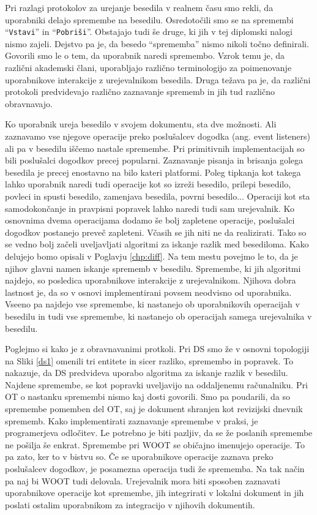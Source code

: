 \documentclass[a4paper, 12pt, twoside]{book}
\begin{document}
Pri razlagi protokolov za urejanje besedila v realnem času smo rekli, da uporabniki delajo spremembe na besedilu. Osredotočili smo se na spremembi “{\tt Vstavi}” in “{\tt Pobriši}”. Obstajajo tudi še druge, ki jih v tej diplomski nalogi nismo zajeli. Dejstvo pa je, da besedo “sprememba” nismo nikoli točno definirali. Govorili smo le o tem, da uporabnik naredi spremembo. Vzrok temu je, da različni akademski člani, uporabljajo različno terminologijo za poimenovanje uporabnikove interakcije z urejevalnikom besedila. Druga težava pa je, da različni protokoli predvidevajo različno zaznavanje sprememb in jih tud različno obravnavajo.

Ko uporabnik ureja besedilo v svojem dokumentu, sta dve možnosti. Ali zaznavamo vse njegove operacije preko poslušalcev dogodka (ang. event listeners) ali pa v besedilu iščemo nastale spremembe. Pri primitivnih implementacijah so bili poslušalci dogodkov precej popularni. Zaznavanje pisanja in brisanja golega besedila je precej enostavno na bilo kateri platformi. Poleg tipkanja kot takega lahko uporabnik naredi tudi operacije kot so izreži besedilo, prilepi besedilo, povleci in spusti besedilo, zamenjava besedila, povrni besedilo... Operaciji kot sta samodokončanje in pravpisni popravek lahko naredi tudi sam urejevalnik. Ko osnovnima dvema operacijama dodamo še bolj zapletene operacije, poslušalci dogodkov postanejo preveč zapleteni. Včasih se jih niti ne da realizirati. Tako so se vedno bolj začeli uveljavljati algoritmi za iskanje razlik med besediloma. Kako delujejo bomo opisali v Poglavju \ref{chp:diff}. Na tem mestu povejmo le to, da je njihov glavni namen iskanje sprememb v besedilu. Spremembe, ki jih algoritmi najdejo, so posledica uporabnikove interakcije z urejevalnikom. Njihova dobra lastnost je, da so v osnovi implementirani povsem neodvisno od uporabnika. Vseeno pa najdejo vse spremembe, ki nastanejo ob uporabnikovih operacijah v besedilu in tudi vse spremembe, ki nastanejo ob operacijah samega urejevalnika v besedilu.

Poglejmo si kako je z obravnavanimi protkoli. Pri DS smo že v osnovni topologiji na Sliki \ref{ds1} omenili tri entitete in sicer razliko, spremembo in popravek. To nakazuje, da DS predvideva uporabo algoritma za iskanje razlik v besedilu. Najdene spremembe, se kot popravki uveljavijo na oddaljenemu računalniku. Pri OT o nastanku spremembi nismo kaj dosti govorili. Smo pa poudarili, da so spremembe pomemben del OT, saj je dokument shranjen kot revizijski dnevnik sprememb. Kako implementirati zaznavanje spremembe v praksi, je programerjeva odločitev. Le potrebno je biti pazljiv, da se že poslanih spremembe ne pošilja še enkrat. Spremembe pri WOOT se običajno imenujejo operacije. To pa zato, ker to v bistvu so. Če se uporabnikove operacije zaznava preko poslušalcev dogodkov, je posamezna operacija tudi že sprememba. Na tak način pa naj bi WOOT tudi delovala. Urejevalnik mora biti sposoben zaznavati uporabnikove operacije kot spremembe, jih integrirati v lokalni dokument in jih poslati ostalim uporabnikom za integracijo v njihovih dokumentih.
\end{document}
